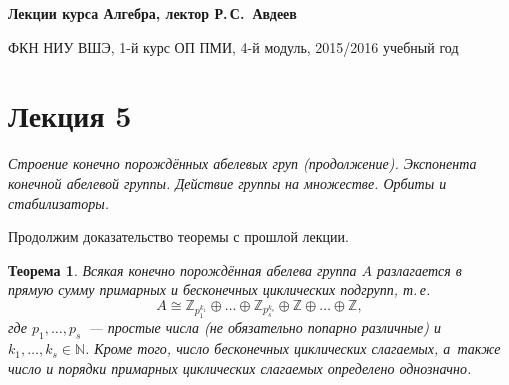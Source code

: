 \documentclass[a4paper,10pt]{amsart}
\def\ZZ{{\mathbb Z}}%
\def\NN{{\mathbb N}}%
\newtheorem{theorem}{Теорема}
\theoremstyle{definition}
\theoremstyle{remark}
\begin{document}
%
\sloppy
%
\centerline{\large \bf Лекции курса \guillemotleft
Алгебра\guillemotright{}, лектор Р.\,С.~Авдеев}

\smallskip

\centerline{\large ФКН НИУ ВШЭ, 1-й курс ОП ПМИ, 4-й модуль,
2015/2016 учебный год}


\bigskip

\section*{Лекция 5}

\medskip

{\it Строение конечно порождённых абелевых груп (продолжение). Экспонента
конечной абелевой группы. Действие группы на множестве. Орбиты и стабилизаторы.}

Продолжим доказательство теоремы с прошлой лекции.

\begin{theorem} \label{traz}
Всякая конечно порождённая абелева группа $A$ разлагается в прямую
сумму примарных и бесконечных циклических подгрупп, т.\,е.
\begin{equation} \label{eqn}
A \cong \ZZ_{p_1^{k_1}} \oplus \ldots \oplus \ZZ_{p_s^{k_s}} \oplus
\ZZ \oplus \ldots \oplus \ZZ,
\end{equation}
где $p_1, \ldots, p_s$~--- простые числа \textup(не обязательно
попарно различные\textup) и $k_1, \ldots, k_s \in \NN$. Кроме того,
число бесконечных циклических слагаемых, а~также число и порядки
примарных циклических слагаемых определено однозначно.
\end{theorem}
\end{document}
